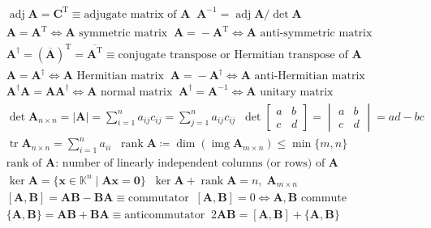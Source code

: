 \begin{align*}
&\operatorname{adj}\mathbf{A}\!=\!\mathbf{C}^{\operatorname{T}}\!\equiv\!\text{adjugate matrix of $\mathbf{A}$}\;\;\mathbf{A}^{-1}\!=\!\operatorname{adj}\mathbf{A}/{\det\mathbf{A}} \\
&\mathbf{A}\!=\!\mathbf{A}^{\operatorname{T}}\Leftrightarrow\mathbf{A}\text{ symmetric matrix}\;\;\mathbf{A}\!=\!-\mathbf{A}^{\operatorname{T}}\Leftrightarrow\mathbf{A}\text{ anti-symmetric matrix} \\
&\mathbf{A}^{\dagger}\!=\!(\overline{\mathbf{A}})^{\operatorname{T}}\!=\!\overline{\mathbf{A}^{\operatorname{T}}}\!\equiv\!\text{conjugate transpose or Hermitian transpose of $\mathbf{A}$} \\
&\mathbf{A}\!=\!\mathbf{A}^{\dagger}\Leftrightarrow\mathbf{A}\text{ Hermitian matrix}\;\;\mathbf{A}\!=\!-\mathbf{A}^{\dagger}\Leftrightarrow\mathbf{A}\text{ anti-Hermitian matrix} \\
&\mathbf{A}^{\dagger}\mathbf{A}\!=\!\mathbf{A}\mathbf{A}^{\dagger}\Leftrightarrow\mathbf{A}\text{ normal matrix}\;\;\mathbf{A}^{\dagger}\!=\!\mathbf{A}^{-1}\Leftrightarrow\mathbf{A}\text{ unitary matrix} \\
&\det\mathbf{A}_{n\times n}\!=\!|\mathbf{A}|\!=\!\sum\nolimits_{i=1}^n a_{ij}c_{ij}\!=\!\sum\nolimits_{j=1}^n a_{ij}c_{ij}\;\;\det\begin{bmatrix}a&b\\c&d\end{bmatrix}\!=\!\begin{vmatrix}a&b\\c&d\end{vmatrix}\!=\!ad\!-\!bc \\
&\operatorname{tr}\mathbf{A}_{n\times n}\!=\!\sum\nolimits_{i=1}^n a_{ii}\;\;\operatorname{rank}\mathbf{A}\!\coloneqq\!\operatorname{dim}(\operatorname{img}\mathbf{A}_{m\times n})\!\leq\!\min\{m,n\}\\
&\text{rank of $\mathbf{A}$: number of linearly independent columns (or rows) of $\mathbf{A}$} \\
&\ker\mathbf{A}\!=\!\{\mathbf{x}\!\in\!\mathbb{K}^n\;|\;\mathbf{Ax}\!=\!\mathbf{0}\}\;\;\ker\mathbf{A}\!+\!\operatorname{rank}\mathbf{A}\!=\!n,\;\mathbf{A}_{m\times n} \\
&[\mathbf{A},\mathbf{B}]\!=\!\mathbf{AB}\!-\!\mathbf{BA}\!\equiv\!\text{commutator}\;\;[\mathbf{A},\mathbf{B}]\!=\!0\Leftrightarrow\mathbf{A},\mathbf{B}\text{ commute} \\
&\{\mathbf{A},\mathbf{B}\}\!=\!\mathbf{AB}\!+\!\mathbf{BA}\!\equiv\!\text{anticommutator}\;\;2\mathbf{AB}\!=\![\mathbf{A},\mathbf{B}]\!+\!\{\mathbf{A},\mathbf{B}\} \\

\end{align*}
